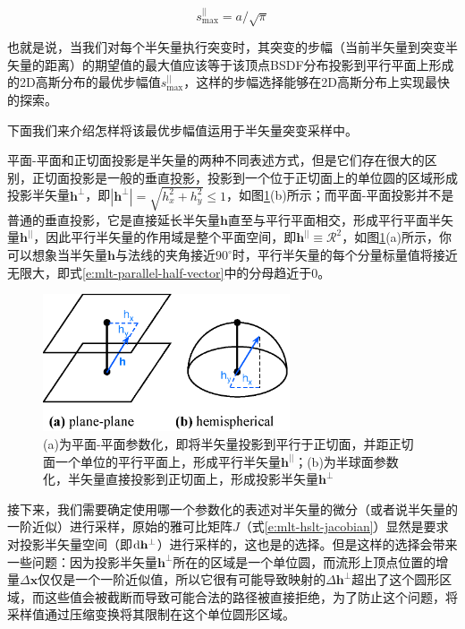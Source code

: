 \begin{equation}
	s^{||}_{\max}=a/\sqrt{\pi}
\end{equation}

\noindent 也就是说，当我们对每个半矢量执行突变时，其突变的步幅（当前半矢量到突变半矢量的距离）的期望值的最大值应该等于该顶点BSDF分布投影到平行平面上形成的2D高斯分布的最优步幅值$s^{||}_{\max}$，这样的步幅选择能够在2D高斯分布上实现最快的探索。

下面我们来介绍怎样将该最优步幅值运用于半矢量突变采样中。

平面-平面和正切面投影是半矢量的两种不同表述方式，但是它们存在很大的区别，正切面投影是一般的垂直投影，投影到一个位于正切面上的单位圆的区域形成投影半矢量$\mathbf{h}^{\perp}$，即$|\mathbf{h}^{\perp}|=\sqrt{h^{2}_x+h^{2}_y} \leq 1$，如图\ref{f:mlt-plane-plane}(b)所示；而平面-平面投影并不是普通的垂直投影，它是直接延长半矢量$\mathbf{h}$直至与平行平面相交，形成平行平面半矢量$\mathbf{h}^{||}$，因此平行半矢量的作用域是整个平面空间，即$\mathbf{h}^{||}\equiv\mathcal{R}^{2}$，如图\ref{f:mlt-plane-plane}(a)所示，你可以想象当半矢量$\mathbf{h}$与法线的夹角接近$90^{\circ}$时，平行半矢量的每个分量标量值将接近无限大，即式\ref{e:mlt-parallel-half-vector}中的分母趋近于0。

\begin{figure}
	\sidecaption
	\includegraphics[width=0.65\textwidth]{figures/mlt/plane-plane}
	\caption{(a)为平面-平面参数化，即将半矢量投影到平行于正切面，并距正切面一个单位的平行平面上，形成平行半矢量$\mathbf{h}^{||}$；(b)为半球面参数化，半矢量直接投影到正切面上，形成投影半矢量$\mathbf{h}^{\perp}$}
	\label{f:mlt-plane-plane}
\end{figure}

接下来，我们需要确定使用哪一个参数化的表述对半矢量的微分（或者说半矢量的一阶近似）进行采样，原始的雅可比矩阵$J$（式\ref{e:mlt-hslt-jacobian}）显然是要求对投影半矢量空间（即${\rm d}\mathbf{h}^{\perp}$）进行采样的，这也是\cite{a:TheNaturalConstraintRepresentationofthePathSpaceforEfficientLightTransportSimulation}的选择。但是这样的选择会带来一些问题：因为投影半矢量$\mathbf{h}^{\perp}$所在的区域是一个单位圆，而流形上顶点位置的增量$\Delta\mathbf{x}$仅仅是一个一阶近似值，所以它很有可能导致映射的$\Delta\mathbf{h}^{\perp}$超出了这个圆形区域，而这些值会被截断而导致可能合法的路径被直接拒绝，为了防止这个问题，\cite{a:TheNaturalConstraintRepresentationofthePathSpaceforEfficientLightTransportSimulation}将采样值通过压缩变换将其限制在这个单位圆形区域。

